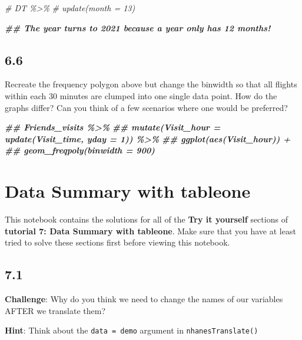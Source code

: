 \documentclass[
]{book}
\newenvironment{Shaded}{\begin{snugshade}}{\end{snugshade}}
\newcommand{\CommentTok}[1]{\textcolor[rgb]{0.56,0.35,0.01}{\textit{#1}}}
\newcommand{\DocumentationTok}[1]{\textcolor[rgb]{0.56,0.35,0.01}{\textbf{\textit{#1}}}}
\begin{document}
\begin{Shaded}
\begin{Highlighting}[]
\CommentTok{\# DT \%\textgreater{}\%}
\CommentTok{\#     update(month = 13)}

\DocumentationTok{\#\# The year turns to 2021 because a year only has 12 months!}
\end{Highlighting}
\end{Shaded}

\hypertarget{section-37}{%
\subsection{6.6}\label{section-37}}

Recreate the frequency polygon above but change the binwidth so that all flights within each 30 minutes are clumped into one single data point. How do the graphs differ? Can you think of a few scenarios where one would be preferred?

\begin{Shaded}
\begin{Highlighting}[]
\DocumentationTok{\#\# Friends\_visits \%\textgreater{}\%}
\DocumentationTok{\#\#    mutate(Visit\_hour = update(Visit\_time, yday = 1)) \%\textgreater{}\%}
\DocumentationTok{\#\#    ggplot(aes(Visit\_hour)) +}
\DocumentationTok{\#\#    geom\_freqpoly(binwidth = 900)}
\end{Highlighting}
\end{Shaded}

\hypertarget{data-summary-with-tableone-1}{%
\section{Data Summary with tableone}\label{data-summary-with-tableone-1}}

This notebook contains the solutions for all of the \textbf{Try it yourself} sections of \textbf{tutorial 7: Data Summary with tableone}. Make sure that you have at least tried to solve these sections first before viewing this notebook.

\hypertarget{section-38}{%
\subsection{7.1}\label{section-38}}

\textbf{Challenge}: Why do you think we need to change the names of our variables AFTER we translate them?

\textbf{Hint}: Think about the \texttt{data\ =\ demo} argument in \texttt{nhanesTranslate()}
\end{document}
